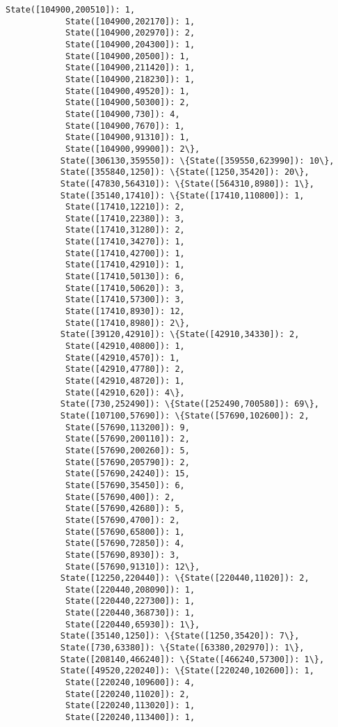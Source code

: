 \documentclass[11pt]{article}
\begin{document}
\begin{Verbatim}[commandchars=\\\{\}]
            State([104900,200510]): 1,
            State([104900,202170]): 1,
            State([104900,202970]): 2,
            State([104900,204300]): 1,
            State([104900,20500]): 1,
            State([104900,211420]): 1,
            State([104900,218230]): 1,
            State([104900,49520]): 1,
            State([104900,50300]): 2,
            State([104900,730]): 4,
            State([104900,7670]): 1,
            State([104900,91310]): 1,
            State([104900,99900]): 2\},
           State([306130,359550]): \{State([359550,623990]): 10\},
           State([355840,1250]): \{State([1250,35420]): 20\},
           State([47830,564310]): \{State([564310,8980]): 1\},
           State([35140,17410]): \{State([17410,110800]): 1,
            State([17410,12210]): 2,
            State([17410,22380]): 3,
            State([17410,31280]): 2,
            State([17410,34270]): 1,
            State([17410,42700]): 1,
            State([17410,42910]): 1,
            State([17410,50130]): 6,
            State([17410,50620]): 3,
            State([17410,57300]): 3,
            State([17410,8930]): 12,
            State([17410,8980]): 2\},
           State([39120,42910]): \{State([42910,34330]): 2,
            State([42910,40800]): 1,
            State([42910,4570]): 1,
            State([42910,47780]): 2,
            State([42910,48720]): 1,
            State([42910,620]): 4\},
           State([730,252490]): \{State([252490,700580]): 69\},
           State([107100,57690]): \{State([57690,102600]): 2,
            State([57690,113200]): 9,
            State([57690,200110]): 2,
            State([57690,200260]): 5,
            State([57690,205790]): 2,
            State([57690,24240]): 15,
            State([57690,35450]): 6,
            State([57690,400]): 2,
            State([57690,42680]): 5,
            State([57690,4700]): 2,
            State([57690,65800]): 1,
            State([57690,72850]): 4,
            State([57690,8930]): 3,
            State([57690,91310]): 12\},
           State([12250,220440]): \{State([220440,11020]): 2,
            State([220440,208090]): 1,
            State([220440,227300]): 1,
            State([220440,368730]): 1,
            State([220440,65930]): 1\},
           State([35140,1250]): \{State([1250,35420]): 7\},
           State([730,63380]): \{State([63380,202970]): 1\},
           State([208140,466240]): \{State([466240,57300]): 1\},
           State([49520,220240]): \{State([220240,102600]): 1,
            State([220240,109600]): 4,
            State([220240,11020]): 2,
            State([220240,113020]): 1,
            State([220240,113400]): 1,

\end{Verbatim}
\end{document}

